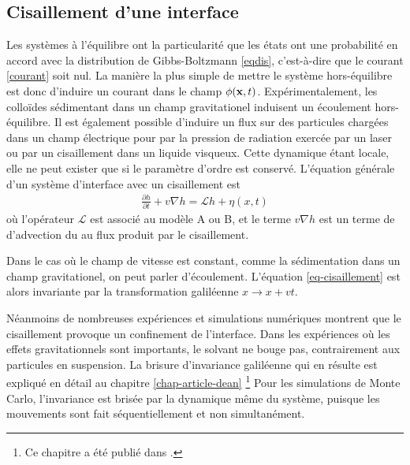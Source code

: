     \subsection{Cisaillement d'une interface}

Les systèmes à l'équilibre ont la particularité que les états ont une probabilité en accord avec la distribution de Gibbs-Boltzmann \ref{eqdis}, c'est-à-dire que le courant \ref{courant} soit nul. La manière la plus simple de mettre le système hors-équilibre est donc d'induire un courant dans le champ $\phi({\bf x},t)$. Expérimentalement, les colloïdes sédimentant dans un champ gravitationel induisent un écoulement hors-équilibre. Il est également possible d'induire un flux sur des particules chargées dans un champ électrique pour par la pression de radiation exercée par un laser ou par un cisaillement dans un liquide visqueux. Cette dynamique étant locale, elle ne peut exister que si le paramètre d'ordre est conservé. L'équation générale d'un système d'interface avec un cisaillement est\cite{bray_interface_2001-1,bray_interface_2001}
\begin{align}
     \frac{\partial h}{\partial t} + v \nabla h =  \mathcal{L} h +  \eta(x,t)
     \label{eq-cisaillement}
\end{align}
où l'opérateur $\mathcal{L}$ est associé au modèle A ou B, et le terme $v \nabla h$ est un terme de d'advection du au flux produit par le cisaillement. 

Dans le cas où le champ de vitesse est constant, comme la sédimentation dans un champ gravitationel, on peut parler d'écoulement. L'équation \ref{eq-cisaillement} est alors invariante par la transformation galiléenne $x \rightarrow x+vt$. 

Néanmoins de nombreuses expériences\cite{derks_suppression_2006} et simulations numériques \cite{leung_field_1986,rikvold_microstructure_2002,gonnella_nonequilibrium_2009,smith_driven_2010,smith_interfaces_2008,sadhu_non-local_2014,cohen_interface_2016} montrent que le cisaillement provoque un confinement de l'interface. Dans les expériences où les effets gravitationnels sont importants, le solvant ne bouge pas, contrairement aux particules en suspension. La brisure d'invariance galiléenne qui en résulte est expliqué en détail au chapitre \ref{chap-article-dean} \footnote{Ce chapitre a été publié dans \cite{dean_effect_2020}.}
Pour les simulations de Monte Carlo, l'invariance est brisée par la dynamique même du système, puisque les mouvements sont fait séquentiellement et non simultanément.

